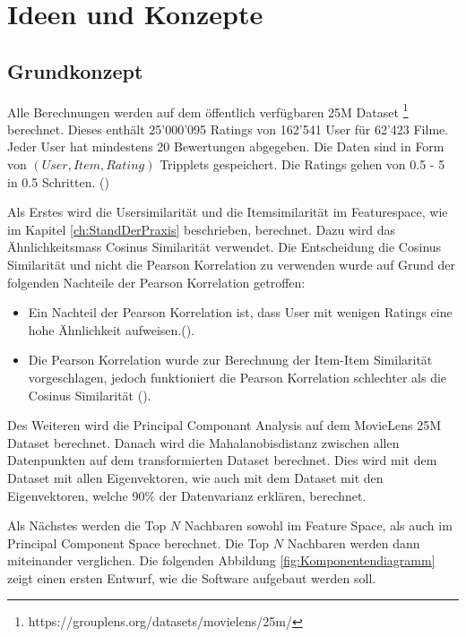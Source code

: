 \chapter{Ideen und Konzepte}
\label{sec: Ideen, Konzepte}
\section{Grundkonzept}


Alle Berechnungen werden auf dem öffentlich verfügbaren 25M Dataset \footnote{https://grouplens.org/datasets/movielens/25m/} berechnet. Dieses enthält 25'000'095 Ratings von 162'541 User für 62'423 Filme. Jeder User hat mindestens 20 Bewertungen abgegeben. Die Daten sind in Form von $(User, Item, Rating)$ Tripplets gespeichert. Die Ratings gehen von 0.5 - 5 in 0.5 Schritten. (\cite{DatasetReadme})

 Als Erstes wird die Usersimilarität und die Itemsimilarität im Featurespace, wie im Kapitel \ref{ch:StandDerPraxis}  beschrieben, berechnet. Dazu wird das Ähnlichkeitsmass Cosinus Similarität verwendet. Die Entscheidung die Cosinus Similarität und nicht die Pearson Korrelation zu verwenden wurde auf Grund der folgenden Nachteile der Pearson Korrelation getroffen:
\begin{itemize}
    \item Ein Nachteil der Pearson Korrelation ist, dass User mit wenigen Ratings eine hohe Ähnlichkeit aufweisen.(\cite{Ekstrand2011}).
    \item Die Pearson Korrelation wurde zur Berechnung der Item-Item Similarität vorgeschlagen, jedoch funktioniert die Pearson Korrelation schlechter als die Cosinus Similarität (\cite{10.1145/371920.372071}).
    
    
\end{itemize}

Des Weiteren wird die Principal Componant Analysis auf dem MovieLens 25M Dataset berechnet. Danach wird die Mahalanobisdistanz zwischen allen Datenpunkten auf dem transformierten Dataset berechnet. Dies wird mit dem Dataset mit allen Eigenvektoren, wie auch mit dem Dataset mit den Eigenvektoren, welche 90\% der Datenvarianz erklären, berechnet.

Als Nächstes werden die Top $N$ Nachbaren sowohl im Feature Space, als auch im Principal Component Space berechnet. Die Top $N$ Nachbaren werden dann miteinander verglichen. Die folgenden Abbildung \ref{fig:Komponentendiagramm} zeigt einen ersten Entwurf, wie die Software aufgebaut werden soll.

